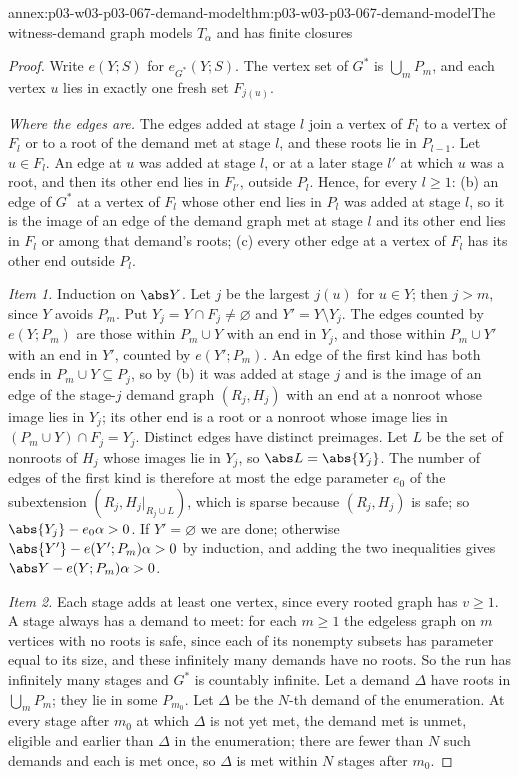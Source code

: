 \begin{annexitem}{annex:p03-w03-p03-067-demand-model}{thm:p03-w03-p03-067-demand-model}{The witness-demand graph models \(T_\alpha\) and has finite closures}
\begin{proof}
Write \(e(Y;S)\) for \(e_{G^\ast}(Y;S)\).  The vertex set of \(G^\ast\) is
\(\bigcup_mP_m\), and each vertex \(u\) lies in exactly one fresh set
\(F_{j(u)}\).

\emph{Where the edges are.}  The edges added at stage \(l\) join a vertex of
\(F_l\) to a vertex of \(F_l\) or to a root of the demand met at stage
\(l\), and these roots lie in \(P_{l-1}\).  Let \(u\in F_l\).  An edge at
\(u\) was added at stage \(l\), or at a later stage \(l'\) at which \(u\) was
a root, and then its other end lies in \(F_{l'}\), outside \(P_l\).  Hence,
for every \(l\geq1\): (b) an edge of \(G^\ast\) at a vertex of \(F_l\) whose
other end lies in \(P_l\) was added at stage \(l\), so it is the image of an
edge of the demand graph met at stage \(l\) and its other end lies in
\(F_l\) or among that demand's roots; (c) every other edge at a vertex of
\(F_l\) has its other end outside \(P_l\).

\emph{Item 1.}  Induction on \(\abs Y\).  Let \(j\) be the largest
\(j(u)\) for \(u\in Y\); then \(j>m\), since \(Y\) avoids \(P_m\).  Put
\(Y_j=Y\cap F_j\neq\varnothing\) and \(Y'=Y\setminus Y_j\).  The edges
counted by \(e(Y;P_m)\) are those within \(P_m\cup Y\) with an end in
\(Y_j\), and those within \(P_m\cup Y'\) with an end in \(Y'\), counted by
\(e(Y';P_m)\).  An edge of the first kind has both ends in
\(P_m\cup Y\subseteq P_j\), so by (b) it was added at stage \(j\) and is the
image of an edge of the stage-\(j\) demand graph \((R_j,H_j)\) with an end
at a nonroot whose image lies in \(Y_j\); its other end is a root or a
nonroot whose image lies in \((P_m\cup Y)\cap F_j=Y_j\).  Distinct edges have
distinct preimages.  Let \(L\) be the set of nonroots of \(H_j\) whose
images lie in \(Y_j\), so \(\abs L=\abs{Y_j}\).  The number of edges of the
first kind is therefore at most the edge parameter \(e_0\) of the
subextension \((R_j,H_j|_{R_j\cup L})\), which is sparse because
\((R_j,H_j)\) is safe; so \(\abs{Y_j}-e_0\alpha>0\).  If
\(Y'=\varnothing\) we are done; otherwise
\(\abs{Y'}-e(Y';P_m)\alpha>0\) by induction, and adding the two
inequalities gives \(\abs Y-e(Y;P_m)\alpha>0\).

\emph{Item 2.}  Each stage adds at least one vertex, since every rooted graph
has \(v\geq1\).  A stage always has a demand to meet: for each \(m\geq1\)
the edgeless graph on \(m\) vertices with no roots is safe, since each of
its nonempty subsets has parameter equal to its size, and these
infinitely many demands have no roots.  So the run has infinitely many
stages and \(G^\ast\) is countably infinite.  Let a demand \(\Delta\) have
roots in \(\bigcup_mP_m\); they lie in some \(P_{m_0}\).  Let \(\Delta\) be
the \(N\)-th demand of the enumeration.  At every stage after \(m_0\) at
which \(\Delta\) is not yet met, the demand met is unmet, eligible and
earlier than \(\Delta\) in the enumeration; there are fewer than \(N\) such
demands and each is met once, so \(\Delta\) is met within \(N\) stages
after \(m_0\).


\end{proof}
\end{annexitem}
